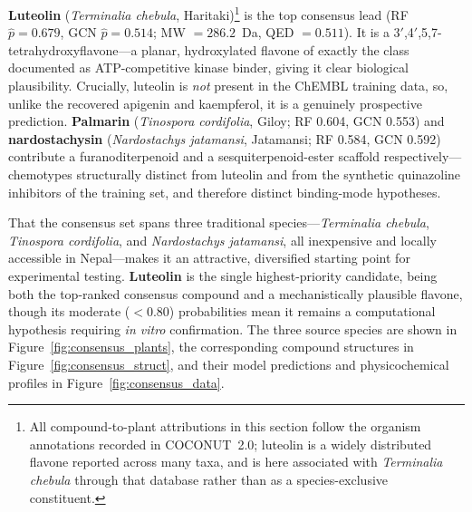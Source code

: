 \textbf{Luteolin} (\textit{Terminalia chebula}, Haritaki)\footnote{All
compound-to-plant attributions in this section follow the organism annotations
recorded in COCONUT~2.0; luteolin is a widely distributed flavone reported across
many taxa, and is here associated with \textit{Terminalia chebula} through that
database rather than as a species-exclusive constituent.} is the top consensus lead
(RF $\hat{p} = 0.679$, GCN $\hat{p} = 0.514$; MW $= 286.2$~Da, QED $= 0.511$). It is a
3$'$,4$'$,5,7-tetrahydroxyflavone---a planar, hydroxylated flavone of exactly the class
documented as ATP-competitive kinase binder, giving it clear biological plausibility.
Crucially, luteolin is \emph{not} present in the ChEMBL training data, so, unlike the
recovered apigenin and kaempferol, it is a genuinely prospective prediction.
\textbf{Palmarin} (\textit{Tinospora cordifolia}, Giloy; RF 0.604, GCN 0.553) and
\textbf{nardostachysin} (\textit{Nardostachys jatamansi}, Jatamansi; RF 0.584, GCN
0.592) contribute a furanoditerpenoid and a sesquiterpenoid-ester scaffold
respectively---chemotypes structurally distinct from luteolin and from the synthetic
quinazoline inhibitors of the training set, and therefore distinct binding-mode
hypotheses.

That the consensus set spans three traditional species---\textit{Terminalia chebula},
\textit{Tinospora cordifolia}, and \textit{Nardostachys jatamansi}, all inexpensive and
locally accessible in Nepal---makes it an attractive, diversified starting point for
experimental testing. \textbf{Luteolin} is the single highest-priority candidate,
being both the top-ranked consensus compound and a mechanistically plausible flavone,
though its moderate ($<0.80$) probabilities mean it remains a computational hypothesis
requiring \textit{in vitro} confirmation. The three source species are shown in
Figure~\ref{fig:consensus_plants}, the corresponding compound structures in
Figure~\ref{fig:consensus_struct}, and their model predictions and physicochemical
profiles in Figure~\ref{fig:consensus_data}.

